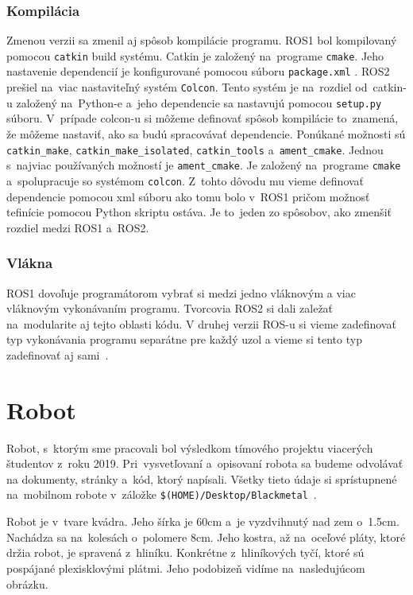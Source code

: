 \subsubsection{Kompilácia}

	Zmenou verzii sa zmenil aj spôsob kompilácie programu. ROS1 bol kompilovaný pomocou \texttt{catkin} build systému. Catkin je založený
	na~programe \texttt{cmake}. Jeho nastavenie dependencií je konfigurované pomocou súboru \texttt{package.xml} . ROS2 prešiel na~viac
	nastaviteľný systém \texttt{Colcon}. Tento systém je na~rozdiel od~catkin-u založený na~Python-e a~jeho dependencie sa nastavujú pomocou
	\texttt{setup.py} súboru. V~prípade colcon-u si môžeme definovať spôsob kompilácie to~znamená, že môžeme nastaviť, ako sa budú spracovávať
	dependencie. Ponúkané možnosti sú \texttt{catkin\_make}, \texttt{catkin\_make\_isolated}, \texttt{catkin\_tools} a~\texttt{ament\_cmake}.
	Jednou s~najviac používaných možností je \texttt{ament\_cmake}. Je založený na~programe \texttt{cmake} a~spolupracuje so systémom \texttt{colcon}.
	Z~tohto dôvodu mu vieme definovať dependencie pomocou xml súboru ako tomu bolo v~ROS1 pričom možnosť tefinície pomocou Python skriptu ostáva.
	Je to~jeden zo spôsobov, ako zmenšiť rozdiel medzi ROS1 a~ROS2.

\subsubsection{Vlákna}

	ROS1 dovoľuje programátorom vybrať si medzi jedno vláknovým a viac vláknovým vykonávaním programu. Tvorcovia ROS2 si dali zaležať na~modularite
	aj tejto oblasti kódu. V druhej verzii ROS-u si vieme zadefinovať typ vykonávania programu separátne pre každý uzol a vieme si tento typ
	zadefinovať aj sami~\cite{ROS2design}.

\section{Robot}

Robot, s~ktorým sme pracovali bol výsledkom tímového projektu viacerých študentov \newline z~roku 2019. Pri~vysvetľovaní a~opisovaní robota sa budeme
odvolávať na dokumenty, stránky a~kód, ktorý napísali. Všetky tieto údaje si sprístupnené na~mobilnom robote v~záložke
\newline \texttt{\$(HOME)/Desktop/Blackmetal}~\cite{timovyProjekt}.

Robot je v~tvare kvádra. Jeho šírka je 60cm a~je vyzdvihnutý nad zem o~1.5cm. Nachádza sa na~kolesách o~polomere 8cm. Jeho kostra, až na~oceľové pláty,
ktoré držia robot, je spravená z~hliníku. Konkrétne z~hliníkových tyčí, ktoré sú pospájané plexisklovými plátmi. Jeho podobizeň vidíme na~nasledujúcom
obrázku.

